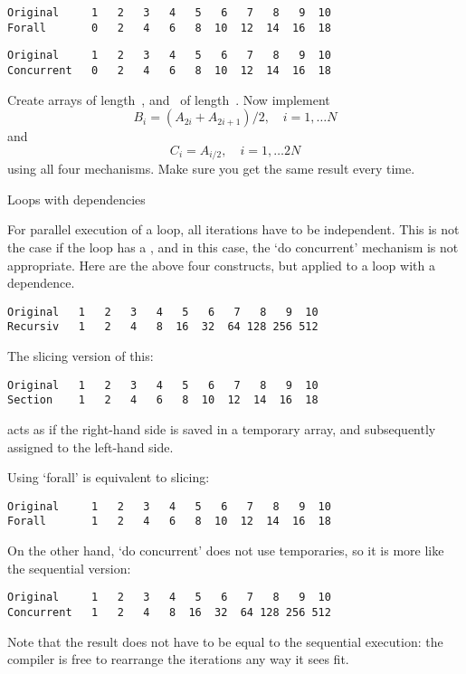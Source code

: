 \begin{lstlisting}
Original     1   2   3   4   5   6   7   8   9  10
Forall       0   2   4   6   8  10  12  14  16  18
\end{lstlisting}

\begin{lstlisting}
Original     1   2   3   4   5   6   7   8   9  10
Concurrent   0   2   4   6   8  10  12  14  16  18
\end{lstlisting}

\begin{exercise}
  Create arrays  of length~, and ~of length~.
  Now implement
  \[ B_i = (A_{2i}+A_{2i+1})/2,\quad i=1,\ldots N \]
  and
  \[ C_i = A_{i/2},\quad i=1,\ldots 2N \]
  using all four mechanisms. Make sure you get the same result every time.
\end{exercise}

 {Loops with dependencies}

For parallel execution of a loop, all iterations have to be independent.
This is not the case if the loop has a , and in
this case, the `do concurrent' mechanism is not appropriate.
%
Here are the above four constructs, but applied to a loop with a dependence.
%
%
\begin{lstlisting}
Original   1   2   3   4   5   6   7   8   9  10
Recursiv   1   2   4   8  16  32  64 128 256 512
\end{lstlisting}

The slicing version of this:
%
%
\begin{lstlisting}
Original   1   2   3   4   5   6   7   8   9  10
Section    1   2   4   6   8  10  12  14  16  18
\end{lstlisting}
%
acts as if the right-hand side is saved in a temporary array, and
subsequently assigned to the left-hand side.

Using `forall' is equivalent to slicing:
%
%
\begin{lstlisting}
Original     1   2   3   4   5   6   7   8   9  10
Forall       1   2   4   6   8  10  12  14  16  18
\end{lstlisting}

On the other hand, `do concurrent' does not use temporaries, so it is
more like the sequential version:
%
%
\begin{lstlisting}
Original     1   2   3   4   5   6   7   8   9  10
Concurrent   1   2   4   8  16  32  64 128 256 512
\end{lstlisting}
Note that the result does not have to be equal to the sequential
execution: the compiler is free to rearrange the iterations any way it
sees fit.

